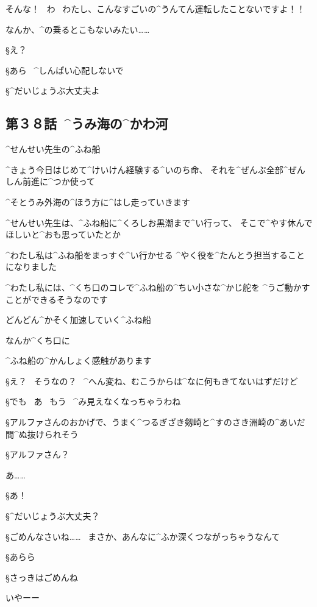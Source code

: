 \page
\A そんな！
\ わ
\ わたし、こんなすごいの^{うんてん}{運転}したことないですよ！！

\A なんか、^{の}{乗}るとこもないみたい……

\S え？

\S あら
\ ^{しんぱい}{心配}しないで

\S ^{だいじょうぶ}{大丈夫}よ


\subsection{第３８話\ ^{うみ}{海}の^{かわ}{河}}

\page[83]
\A ^{せんせい}{先生}の^{ふね}{船}

\A ^{きょう}{今日}はじめて^{けいけん}{経験}する^{いのち}{命}、
それを^{ぜんぶ}{全部}^{ぜんしん}{前進}に^{つか}{使}って

\A ^{そとうみ}{外海}の^{ほう}{方}に^{はし}{走}っていきます

\A ^{せんせい}{先生}は、^{ふね}{船}に^{くろしお}{黒潮}まで^{い}{行}って、
そこで^{やす}{休}んでほしいと^{おも}{思}っていたとか

\page
\A ^{わたし}{私}は^{ふね}{船}をまっすぐ^{い}{行}かせる
^{やく}{役}を^{たんとう}{担当}することになりました

\A ^{わたし}{私}には、^{くち}{口}のコレで^{ふね}{船}の^{ちい}{小}さな^{かじ}{舵}を
^{うご}{動}かすことができるそうなのです

\page
\A どんどん^{かそく}{加速}していく^{ふね}{船}

\page
\A なんか^{くち}{口}に

\A ^{ふね}{船}の^{かんしょく}{感触}があります

\S え？
\ そうなの？
\ ^{へん}{変}ね、むこうからは^{なに}{何}もきてないはずだけど

\S でも
\ あ
\ もう
\ ^{み}{見}えなくなっちゃうわね

\page
\S アルファさんのおかげで、うまく^{つるぎざき}{剱崎}と^{すのさき}{洲崎}の^{あいだ}{間}^{ぬ}{抜}けられそう

\S アルファさん？

\page[94]
\A あ……

\S あ！

\S ^{だいじょうぶ}{大丈夫}？

\S ごめんなさいね……
\ まさか、あんなに^{ふか}{深}くつながっちゃうなんて

\page
\S あらら

\page
\S さっきはごめんね

\A いやーー

